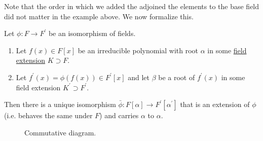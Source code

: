   Note that the order in which we added the adjoined the elements to the base field did not matter in the example above. We now formalize this. 

  \begin{theorem}
    \label{thm:extending_field_iso}
    Let $\phi: F \to F^\prime$ be an isomorphism of fields.
    \begin{enumerate}
      \item Let $f(x) \in F[x]$ be an irreducible polynomial with root $\alpha$ in some \hyperref[def:field-extension]{field extension} $K \supset F$.
      \item Let $f^\prime(x) = \phi(f(x)) \in F^\prime[x]$ and let $\beta$ be a root of $f^\prime(x)$ in some field extension $K^\prime \supset F^\prime$. 
    \end{enumerate}
    Then there is a unique isomorphism $\bar{\phi} : F[\alpha] \to F^\prime [\alpha^\prime]$ that is an extension of $\phi$ (i.e. behaves the same under $F$) and carries $\alpha$ to $\alpha$. 
    \begin{figure}[H]
      \centering 
      \caption{Commutative diagram.} 
      \label{fig:field_isomorphism_extension}
    \end{figure}
  \end{theorem}
